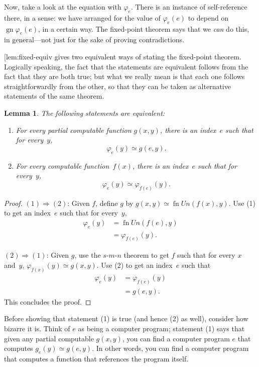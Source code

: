\documentclass[10pt,a4paper]{article}
\makeatletter
\theoremstyle{plain}
\newtheorem{lem}[thm]{Lemma}
\theoremstyle{definition}
\theoremstyle{remark}
\newenvironment{explain}{}{}
\newcommand*{\ollabel}[1]{\label{#1}}
\newcommand{\olref}{\@ifnextchar[{\olref@i}{\olref@final}}
\def\olref@i[#1]{\@ifnextchar[{\olref@ii}{\olref@final}}
\def\olref@ii[#1]{\@ifnextchar[{\olref@iii}{\olref@final}}
\def\olref@iii[#1]{\olref@final}
\def\olref@final#1{\ref{#1}}
\providecommand{\cfind}[1]{\varphi_{#1}}
\providecommand{\gn}{\operatorname{gn}}
\providecommand{\fn}{\operatorname{fn}}
\makeatother
\begin{document}
Now, take a look at the equation with $\cfind{e}$. There is an instance of
self-reference there, in a sense: we have arranged for the value of
$\cfind{e}(e)$ to depend on $\gn{\cfind{e}(e)}$, in a certain way. The
fixed-point theorem says that we {\em can} do this, in general---not
just for the sake of proving contradictions.

\olref{lem:fixed-equiv} gives two equivalent ways of stating the
fixed-point theorem. Logically speaking, the fact that the statements
are equivalent follows from the fact that they are both true; but what
we really mean is that each one follows straightforwardly from the
other, so that they can be taken as alternative statements of the same
theorem.

\begin{lem}
\ollabel{lem:fixed-equiv}
The following statements are equivalent:
\begin{enumerate}
\item For every partial computable function $g(x,y)$, there is an
  index~$e$ such that for every~$y$,
\[
\cfind{e}(y) \simeq g(e,y).
\]
\item For every computable function~$f(x)$, there is an index~$e$ such
  that for every~$y$,
\[
\cfind{e}(y) \simeq \cfind{f(e)}(y).
\]
\end{enumerate}
\end{lem}

\begin{proof}
$(1) \Rightarrow (2)$: Given $f$, define $g$ by $g(x,y) \simeq
\fn{Un}(f(x),y)$. Use (1) to get an index~$e$ such that for every~$y$,
\begin{align*}
\cfind{e}(y) & = \fn{Un}(f(e),y) \\
& = \cfind{f(e)}(y).
\end{align*}

$(2) \Rightarrow (1)$: Given $g$, use the $s$-$m$-$n$ theorem to get $f$ such
that for every $x$ and~$y$, $\cfind{f(x)}(y) \simeq g(x,y)$. Use (2) to
get an index~$e$ such that
\begin{align*}
\cfind{e}(y) & = \cfind{f(e)}(y) \\
& = g(e,y).
\end{align*}
This concludes the proof.
\end{proof}

\begin{explain}
Before showing that statement (1) is true (and hence (2) as well),
consider how bizarre it is. Think of $e$ as being a computer program;
statement (1) says that given any partial computable $g(x,y)$, you can
find a computer program $e$ that computes $g_e(y) \simeq g(e,y)$. In
other words, you can find a computer program that computes a function
that references the program itself.
\end{explain}
\end{document}
